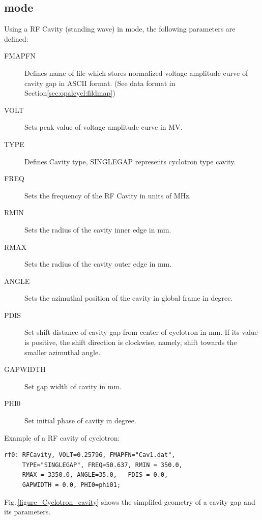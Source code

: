 \subsection{\opalcycl mode}
\label{sec:cavity-cycl}
Using a RF Cavity (standing wave) in \opalcycl mode, the following  parameters are defined:
\begin{description}
\item[FMAPFN]
  Defines name of file which stores normalized voltage amplitude curve of cavity gap in ASCII format.
  (See data format in Section\ref{sec:opalcycl:fildmap})
 \item[VOLT]
  Sets peak value of voltage amplitude curve in MV.
  \item[TYPE]
  Defines Cavity type, SINGLEGAP represents cyclotron type cavity.   
  \item[FREQ]
  Sets the frequency of the RF Cavity in units of MHz. 
  \item[RMIN]
  Sets the radius of the cavity inner edge in mm.
  \item[RMAX]
  Sets the radius of the cavity outer edge in mm.

  \item[ANGLE]
  Sets the azimuthal position of the cavity in global frame in degree. 

  \item[PDIS]
  Set shift distance of cavity gap from center of cyclotron in mm. If its value is positive, 
  the shift direction is clockwise, namely, shift towards the smaller azimuthal angle.
  
  \item[GAPWIDTH]
  Set gap width of  cavity in mm.

  \item[PHI0]
  Set initial phase of cavity in degree.

\end{description}

\noindent Example of a RF cavity of cyclotron:
\begin{verbatim}
rf0: RFCavity, VOLT=0.25796, FMAPFN="Cav1.dat",
     TYPE="SINGLEGAP", FREQ=50.637, RMIN = 350.0,
     RMAX = 3350.0, ANGLE=35.0,   PDIS = 0.0,
     GAPWIDTH = 0.0, PHI0=phi01;
\end{verbatim}

Fig.\,\ref{figure_Cyclotron_cavity} shows the simplifed geometry of a cavity gap and its parameters.

